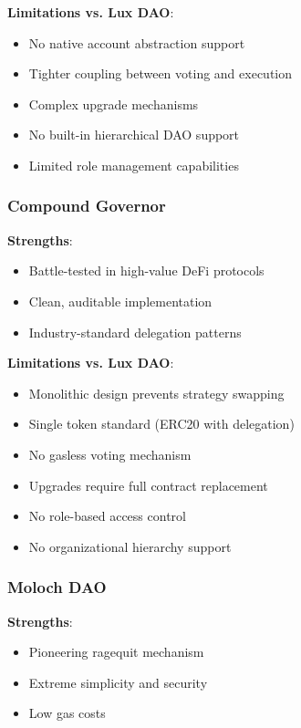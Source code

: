 \textbf{Limitations vs. Lux DAO}:
\begin{itemize}
    \item No native account abstraction support
    \item Tighter coupling between voting and execution
    \item Complex upgrade mechanisms
    \item No built-in hierarchical DAO support
    \item Limited role management capabilities
\end{itemize}

\subsubsection{Compound Governor}

\textbf{Strengths}:
\begin{itemize}
    \item Battle-tested in high-value DeFi protocols
    \item Clean, auditable implementation
    \item Industry-standard delegation patterns
\end{itemize}

\textbf{Limitations vs. Lux DAO}:
\begin{itemize}
    \item Monolithic design prevents strategy swapping
    \item Single token standard (ERC20 with delegation)
    \item No gasless voting mechanism
    \item Upgrades require full contract replacement
    \item No role-based access control
    \item No organizational hierarchy support
\end{itemize}

\subsubsection{Moloch DAO}

\textbf{Strengths}:
\begin{itemize}
    \item Pioneering ragequit mechanism
    \item Extreme simplicity and security
    \item Low gas costs
\end{itemize}

